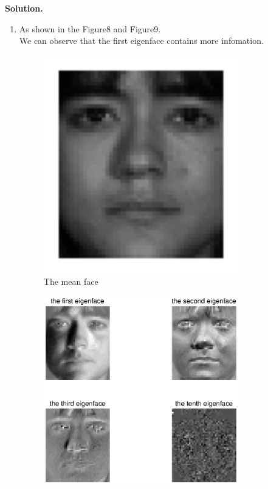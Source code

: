 \documentclass[english,onecolumn]{IEEEtran}
\begin{document}
\noindent
\textbf{Solution.}
\begin{enumerate}
\item
	As shown in the Figure8 and Figure9.\\
	We can observe that the first eigenface contains more infomation.\\
	\begin{figure}[htbp]
				\centering
				\includegraphics[width=0.8\textwidth]{fig4_1_1.eps}
				\caption{The mean face}
			\end{figure}
	\begin{figure}[htbp]
				\centering
				\includegraphics[width=0.8\textwidth]{fig4_1_2.eps}

\end{figure}
\end{enumerate}
\end{document}
